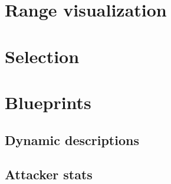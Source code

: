 \section{Range visualization}

\section{Selection}

\section{Blueprints}

\subsection{Dynamic descriptions}

\subsection{Attacker stats}